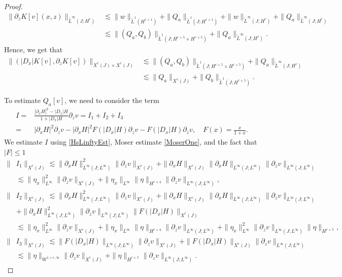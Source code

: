 \documentclass[12pt]{amsart}
\theoremstyle{definition}
\numberwithin{equation}{section}
\newcommand{\p}{\partial}
\newcommand{\wt}{\widetilde}
\begin{document}
\begin{proof}
\begin{align*}
  \|\p_z K[v](x, z)\|_{\wt L^\infty(J; H^{r})}&\lesssim \| w\|_{\wt L^1(H^{r+1})}+\| Q_a\|_{\wt L^1(J; H^{r+1})} + \| w\|_{\wt L^\infty (J;H^{r})} + \|Q_a\|_{\wt L^\infty(J; H^{r})} \\
 &\lesssim \| (Q_a, Q_b)\|_{\wt L^1(J; H^{r+5}\times H^{r+5})} + \|Q_a\|_{ \wt L^\infty(J; H^{r})}.
\end{align*}
Hence, we get that
\begin{align*}
\|( |D_x| K[v],\p_z K[v])\|_{X^r(J) \times X^r(J)} &\lesssim \| (Q_a, Q_b)\|_{\wt L^1(J; H^{r+5}\times H^{r+5})} + \|Q_a\|_{ \wt L^\infty(J; H^{r})} \\
&\lesssim  \|Q_a\|_{X^r(J)} +  \| Q_b\|_{\wt L^1(J;  H^{r+5})}.
\end{align*}

To estimate $Q_a[v]$, we need to consider the term
\begin{align*}
    I =&  \frac{|\partial_xH|^2-|D_x|H}{1+|D_x|H}\partial_zv = I_1 + I_2+ I_3 \\
    =& |\partial_xH|^2 \partial_zv - |\partial_xH|^2F(|D_x|H) \partial_zv  - F(|D_x|H)\partial_zv, \quad F(x) = \frac{x}{1+x}.
\end{align*}
We estimate $I$ using \eqref{HsLinftyEst}, Moser estimate \eqref{MoserOne}, and the fact that $|F|\leq 1$
\begin{align*}
 \|&I_1\|_{X^r(J)} \lesssim \|\p_x H \|^2_{L^\infty(J; L^\infty)} \|\p_z v\|_{X^r(J)} + \| \p_x H \|_{X^r(J)} \| \p_x H \|_{L^\infty(J; L^\infty)}\|\p_z v\|_{L^\infty(J; L^\infty)} \\
 &\lesssim \|\eta_x\|^2_{L^\infty} \|\p_z v\|_{X^r(J)} + \|\eta_x\|_{L^\infty} \|\eta\|_{H^{r+4}} \|\p_z v\|_{L^\infty(J; L^\infty)}, \\
 \|&I_2\|_{X^r(J)} \lesssim  \|\p_x H \|^2_{L^\infty(J; L^\infty)} \|\p_z v\|_{X^r(J)} + \| \p_x H \|_{X^r(J)} \| \p_x H \|_{L^\infty(J; L^\infty)}\|\p_z v\|_{L^\infty(J; L^\infty)} \\
 &+ \|\p_x H \|^2_{L^\infty(J; L^\infty)} \|\p_z v\|_{L^\infty(J; L^\infty)}  \|F(|D_x|H) \|_{X^r(J)}\\
 &\lesssim \|\eta_x\|^2_{L^\infty} \|\p_z v\|_{X^r(J)} + \|\eta_x\|_{L^\infty} \|\eta\|_{H^{r+4}} \|\p_z v\|_{L^\infty(J; L^\infty)} + \|\eta_x\|^2_{L^\infty} \|\p_z v\|_{L^\infty(J; L^\infty)} \|\eta\|_{H^{r+5}}, \\
 \|&I_3\|_{X^r(J)} \lesssim \|F(|D_x|H) \|_{L^\infty(J; L^\infty)} \|\p_z v\|_{X^r(J)} + \|F(|D_x|H) \|_{X^r(J)} \|\p_z v\|_{L^\infty(J; L^\infty)} \\
 &\lesssim \|\eta\|_{W^{1+\epsilon,\infty}}  \|\p_z v\|_{X^r(J)} + \| \eta\|_{H^{r+5}}   \|\p_z v\|_{L^\infty(J; L^\infty)}. 

\end{align*}
\end{proof}
\end{document}
